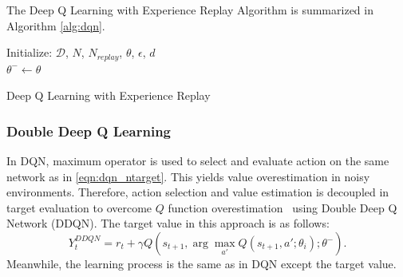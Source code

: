 The Deep Q Learning with Experience Replay Algorithm is summarized in Algorithm \ref{alg:dqn}. 

\begin{algorithm}[H]
	\SetAlgoLined
	\DontPrintSemicolon %
	Initialize: $\mathcal{D}$, $N$, $N_{replay}$, $\theta$, $\epsilon$, $d$ \\
	$\theta^- \leftarrow \theta$ \\
	\caption{Deep Q Learning with Experience Replay}
	\label{alg:dqn}
\end{algorithm}

\subsubsection{Double Deep Q Learning}
In DQN, maximum operator is used to select and evaluate action on the same network as in \eqref{eqn:dqn_ntarget}. 
This yields value overestimation in noisy environments. 
Therefore, action selection and value estimation is decoupled in target evaluation 
to overcome $Q$ function overestimation~\cite{van_hasselt_deep_2015} using Double Deep Q Network (DDQN). The target value in this approach is as follows:
\begin{equation}
\label{eqn:ddqn_ntarget}
Y_t^{DDQN} = r_t + \gamma Q(s_{t+1}, \arg\max_{a'} Q(s_{t+1}, a'; \theta_i );\theta^-).
\end{equation}
Meanwhile, the learning process is the same as in DQN except the target value. 

